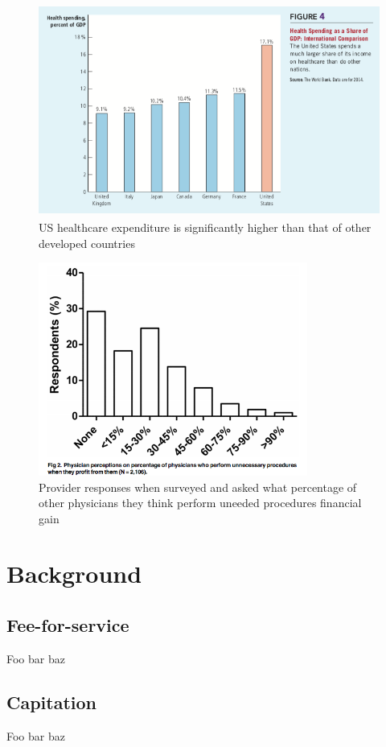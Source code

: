 \documentclass[a4paper]{llncs}
\begin{document}
\begin{figure}
\includegraphics[height=7cm]{usspend}
\centering
\caption{US healthcare expenditure is significantly higher than that of other developed countries}
\label{fig:usspend}
\end{figure}

\begin{figure}
\includegraphics[height=7cm]{overtreat}
\centering
\caption{Provider responses when surveyed and asked what percentage of other physicians they think perform uneeded procedures financial gain \cite{overtreat}}
\label{fig:overtreat}
\end{figure}


\section*{Background}

\subsection*{Fee-for-service}
Foo bar baz

\subsection*{Capitation}
Foo bar baz
\end{document}
